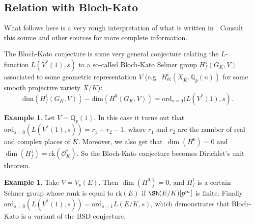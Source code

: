 \documentclass[12pt]{article}
\theoremstyle{definition}
\newtheorem{example}[theorem]{Example}
\numberwithin{equation}{subsection}
\newcommand{\Q}{\ensuremath{\mathbb{Q}}}
\begin{document}
\subsection{Relation with Bloch-Kato}

What follows here is a very rough interpretation of what is written in \cite{LoefflerZerbes}. Consult this source and other sources for more complete information.

The Bloch-Kato conjecture is some very general conjecture relating the $L$-function $L(V^*(1), s)$ to a so-called Bloch-Kato Selmer group $H^1_f(G_K, V)$ associated to some geometric representation $V$ (e.g.\ $H^i_\textrm{\'et}(X_{\overline{K}}, \Q_{p}(n))$ for some smooth projective variety $X/K$):
$$\mathrm{dim}(H_f^1(G_K, V)) - \mathrm{dim}(H^0(G_K, V)) = \mathrm{ord}_{s=0}(L(V^*(1), s).$$

\begin{example}
Let $V = \mathrm{Q}_p(1)$. In this case it turns out that $\mathrm{ord}_{s=0}(L(V^*(1), s)) = r_1 + r_2 - 1$, where $r_1$ and $r_2$ are the number of real and complex places of $K$.
Moreover, we also get that~$\dim(H^0) = 0$ and~$\dim(H^1_f) = \mathrm{rk}(\mathcal{O}_K^*)$.
So the Bloch-Kato conjecture becomes Dirichlet's unit theorem.
\end{example}

\begin{example}
Take $V = V_p(E)$. Then $\dim(H^0) = 0$, and $H^1_f$ is a certain Selmer group whose rank is equal to $\mathrm{rk}(E)$ if $\Sh(E/K)[p^\infty]$ is finite.
Finally $\mathrm{ord}_{s=0}(L(V^*(1), s)) = \mathrm{ord}_{s=1} L(E/K, s)$, which demonstrates that Bloch-Kato is a variant of the BSD conjecture.
\end{example}
\end{document}
